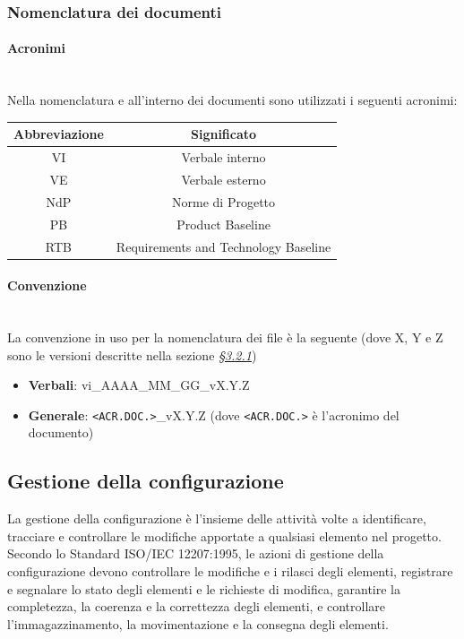 \documentclass[10pt, letterpaper]{article}
\newcommand{\trisubsection}[1]{\paragraph{#1}\mbox{}\\}
\begin{document}
\subsubsection{Nomenclatura dei documenti}
\trisubsection{Acronimi}
Nella nomenclatura e all'interno dei documenti sono utilizzati i seguenti acronimi:

\begin{center}
    \begin{tabular}{|c|c|}
        \hline
        \rowcolor{lightgray} \textbf{Abbreviazione} & \textbf{Significato}                 \\
        \hline
        VI                                          & Verbale interno                      \\
        \hline
        VE                                          & Verbale esterno                      \\
        \hline
        NdP                                         & Norme di Progetto                    \\
        \hline
        PB                                          & Product Baseline                     \\
        \hline
        RTB                                         & Requirements and Technology Baseline \\
        \hline
    \end{tabular}
\end{center}

\trisubsection{Convenzione}
La convenzione in uso per la nomenclatura dei file è la seguente (dove X, Y e Z sono le versioni descritte nella sezione \hyperref[sec:Versionamento]{\textit{§3.2.1}})
\begin{itemize}
    \item \textbf{Verbali}: vi\_AAAA\_MM\_GG\_vX.Y.Z
    \item \textbf{Generale}: \texttt{<ACR.DOC.>}\_vX.Y.Z (dove \texttt{<ACR.DOC.>} è l'acronimo del documento)
\end{itemize}
\subsection{Gestione della configurazione}
La gestione della configurazione è l'insieme delle attività volte a identificare, tracciare e controllare le modifiche apportate a qualsiasi elemento nel progetto.
Secondo lo Standard ISO/IEC 12207:1995, le azioni di gestione della configurazione devono controllare le modifiche e i rilasci degli elementi, registrare e segnalare lo stato degli elementi e
le richieste di modifica, garantire la completezza, la coerenza e la correttezza degli elementi, e controllare
l'immagazzinamento, la movimentazione e la consegna degli elementi.
\end{document}
